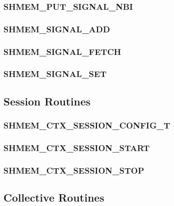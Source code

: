 \documentclass[10pt,oneside]{book}
\begin{document}
\subsubsection{\textbf{SHMEM\_PUT\_SIGNAL\_NBI}}\label{subsec:shmem_put_signal_nbi}


\subsubsection{\textbf{SHMEM\_SIGNAL\_ADD}}\label{subsec:shmem_signal_add}


\subsubsection{\textbf{SHMEM\_SIGNAL\_FETCH}}\label{subsec:shmem_signal_fetch}


\subsubsection{\textbf{SHMEM\_SIGNAL\_SET}}\label{subsec:shmem_signal_set}



\subsection{Session Routines}\label{subsec:sessions}


\subsubsection{\textbf{SHMEM\_CTX\_SESSION\_CONFIG\_T}}\label{subsec:shmem_ctx_session_config_t}


\subsubsection{\textbf{SHMEM\_CTX\_SESSION\_START}}\label{subsec:shmem_ctx_session_start}


\subsubsection{\textbf{SHMEM\_CTX\_SESSION\_STOP}}\label{subsec:shmem_ctx_session_stop}



\subsection{Collective Routines}\label{subsec:coll}

\end{document}
